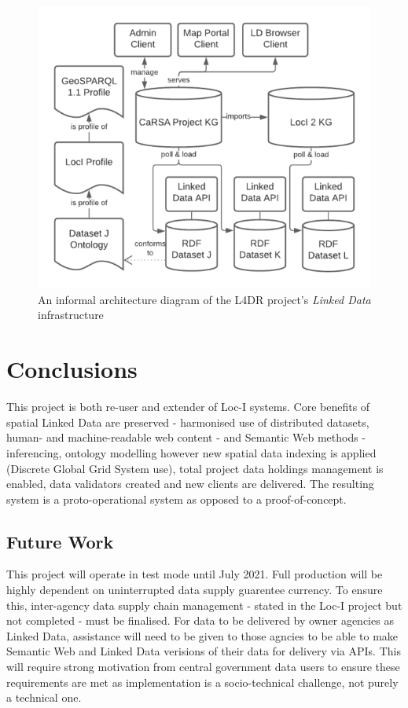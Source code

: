 \documentclass[runningheads]{llncs}
\begin{document}
\begin{figure}[htb]
    \centering
    \includegraphics[width=0.8\linewidth]{images/l4dr-arch.png}
    \caption{An informal architecture diagram of the L4DR project's \textit{Linked Data} infrastructure}
    \label{fig:l4dr-arch}
\end{figure}


\section{Conclusions}\label{sec:conclusions}
This project is both re-user and extender of Loc-I systems. Core benefits of spatial Linked Data are preserved - harmonised use of distributed datasets, human- and machine-readable 
web content - and Semantic Web methods - inferencing, ontology modelling however new spatial data indexing is applied (Discrete Global Grid System use), total project data holdings management is
enabled, data validators created and new clients are delivered. The resulting system is a proto-operational system as opposed to a proof-of-concept.


\subsection{Future Work}\label{sec:futurework}
This project will operate in test mode until July 2021. Full production will be highly dependent on 
uninterrupted data supply guarentee currency. To ensure this, inter-agency data supply chain management - stated in the Loc-I project but not completed - 
must be finalised. For data to be delivered by owner agencies as Linked Data, assistance will need to be given to those agncies to be able to make Semantic Web and Linked Data verisions of their data
for delivery via APIs. This will require strong motivation from central government data users to ensure these requirements are met as implementation is a socio-technical challenge, not purely a 
technical one.
\end{document}
